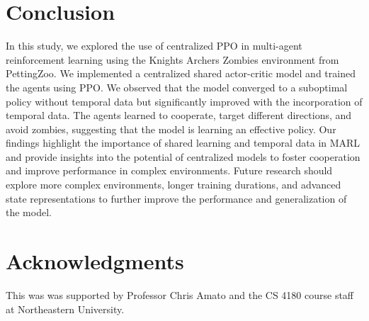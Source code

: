 \documentclass{article}
\begin{document}
\section{Conclusion}
In this study, we explored the use of centralized PPO in multi-agent 
reinforcement learning using the Knights Archers Zombies environment 
from PettingZoo. We implemented a centralized shared actor-critic model 
and trained the agents using PPO. We observed that the model converged 
to a suboptimal policy without temporal data but significantly improved 
with the incorporation of temporal data. The agents learned to cooperate, 
target different directions, and avoid zombies, suggesting that the model 
is learning an effective policy. Our findings highlight the importance of 
shared learning and temporal data in MARL 
and provide insights into the potential of centralized models to foster 
cooperation and improve performance in complex environments. Future 
research should explore more complex environments, longer training 
durations, and advanced state representations to further improve 
the performance and generalization of the model.

\section*{Acknowledgments}
This was was supported by Professor Chris Amato and the CS 4180 course staff at Northeastern University.


  
  
\end{document}
